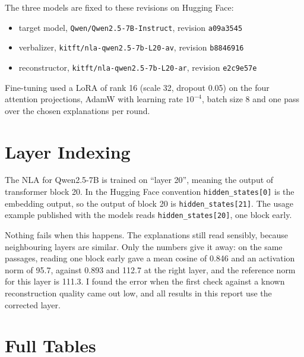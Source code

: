 The three models are fixed to these revisions on Hugging Face:
{\small
\begin{itemize}
\item target model, \texttt{Qwen/Qwen2.5-7B-Instruct}, revision \texttt{a09a3545}
\item verbalizer, \texttt{kitft/nla-qwen2.5-7b-L20-av}, revision \texttt{b8846916}
\item reconstructor, \texttt{kitft/nla-qwen2.5-7b-L20-ar}, revision \texttt{e2c9e57e}
\end{itemize}}
Fine-tuning used a LoRA of rank 16
(scale 32, dropout 0.05) on the four attention projections, AdamW with learning rate $10^{-4}$, batch size 8
and one pass over the chosen explanations per round.

\chapter{Layer Indexing}
\label{app:layer}

The NLA for Qwen2.5-7B is trained on ``layer 20'', meaning the output of transformer block 20. In the
Hugging Face convention \texttt{hidden\_states[0]} is the embedding output, so the output of block 20 is
\texttt{hidden\_states[21]}. The usage example published with the models reads \texttt{hidden\_states[20]},
one block early.

Nothing fails when this happens. The explanations still read sensibly, because neighbouring layers are
similar. Only the numbers give it away: on the same passages, reading one block early gave a mean cosine of
0.846 and an activation norm of 95.7, against 0.893 and 112.7 at the right layer, and the reference norm
for this layer is 111.3. I found the error when the first check against a known reconstruction quality came
out low, and all results in this report use the corrected layer.

\chapter{Full Tables}
\label{app:tables}

\begin{table}[h]
\centering
\footnotesize
\setlength{\tabcolsep}{4pt}

\caption[The agreement filter at each distance]{The agreement filter at each distance (\%, 95\% intervals;
natural text). The pooled rows are Table~\ref{tab:filter}.}
\end{table}

\begin{table}[h]
\centering
\footnotesize
\setlength{\tabcolsep}{4pt}

\caption[Hold back at each distance]{Hold back (first run) against the released verbalizer at each distance. Natural
text, held-out passages; 95\% intervals from a paired bootstrap over entities.}
\end{table}

